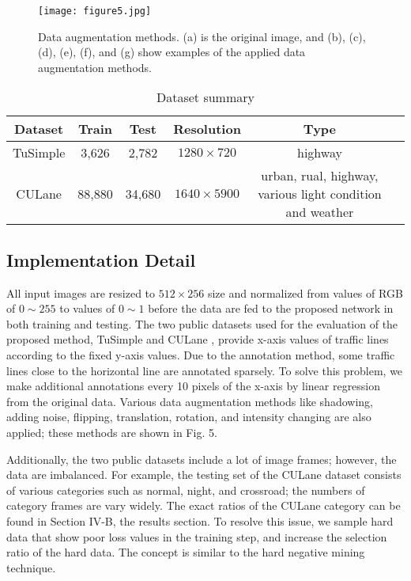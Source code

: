 \documentclass[journal]{IEEEtran}
\begin{document}
\begin{figure}
    \centering
    \texttt{[image: figure5.jpg]}
    \caption{Data augmentation methods. (a) is the original image, and (b), (c), (d), (e), (f), and (g) show examples of the applied data augmentation methods.}
\end{figure}

\begin{table*}[ht]
    \caption{Dataset summary}
    \begin{center}
        \begin{tabular}{|c|c|c|c|c|c|}
            \hline
            Dataset & Train & Test & Resolution & Type \\
            \hline
            \hline
            TuSimple & 3,626 & 2,782 & $1280 \times 720$ & highway \\
            \hline
            CULane & 88,880 & 34,680 & $1640 \times 5900$ & urban, rual, highway, various light condition and weather \\
            \hline
        \end{tabular}
    \end{center}
\end{table*}

\subsection{Implementation Detail}
All input images are resized to $512 \times 256$ size and normalized from values of RGB of $0\sim255$ to values of $0\sim1$ before the data are fed to the proposed network in both training and testing. The two public datasets used for the evaluation of the proposed method, TuSimple \cite{tuSimple} and CULane \cite{pan2018spatial}, provide x-axis values of traffic lines according to the fixed y-axis values. Due to the annotation method, some traffic lines close to the horizontal line are annotated sparsely. To solve this problem, we make additional annotations every 10 pixels of the x-axis by linear regression from the original data. Various data augmentation methods like shadowing, adding noise, flipping, translation, rotation, and intensity changing are also applied; these methods are shown in Fig. 5. 

Additionally, the two public datasets include a lot of image frames; however, the data are imbalanced. For example, the testing set of the CULane dataset consists of various categories such as normal, night, and crossroad; the numbers of category frames are vary widely. The exact ratios of the CULane category can be found in Section IV-B, the results section. To resolve this issue, we sample hard data that show poor loss values in the training step, and increase the selection ratio of the hard data. The concept is similar to the hard negative mining technique.
\end{document}
